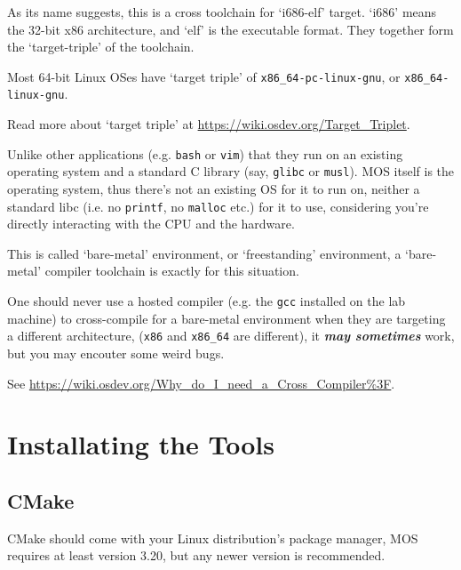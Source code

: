As its name suggests, this is a cross toolchain for `i686-elf' target. `i686' means the 32-bit
x86 architecture, and `elf' is the executable format. They together form the `target-triple' of
the toolchain.

\begin{tip}
    \item Most 64-bit Linux OSes have `target triple' of \texttt{x86\_64-pc-linux-gnu}, or
    \texttt{x86\_64-linux-gnu}.
    \item Read more about `target triple' at \url{https://wiki.osdev.org/Target_Triplet}.
\end{tip}

Unlike other applications (e.g. \texttt{bash} or \texttt{vim}) that they run on an existing
operating system and a standard C library (say, \texttt{glibc} or \texttt{musl}). MOS itself is
the operating system, thus there's not an existing OS for it to run on, neither a standard libc
(i.e. no \texttt{printf}, no \texttt{malloc} etc.) for it to use, considering you're directly
interacting with the CPU and the hardware.

This is called `bare-metal' environment, or `freestanding' environment, a `bare-metal' compiler
toolchain is exactly for this situation.

\begin{warning}
    \item One should never use a hosted compiler (e.g. the \texttt{gcc} installed on the lab machine)
    to cross-compile for a bare-metal environment when they are targeting a different architecture,
    (\texttt{x86} and \texttt{x86\_64} are different), it \textit{\textbf{may sometimes}} work, but
    you may encouter some weird bugs.

    \item See \url{https://wiki.osdev.org/Why_do_I_need_a_Cross_Compiler%3F}.
\end{warning}

\section{Installating the Tools}

\subsection{CMake} \label{sec:cmake-install}

CMake should come with your Linux distribution's package manager, MOS requires at least version
3.20, but any newer version is recommended.

